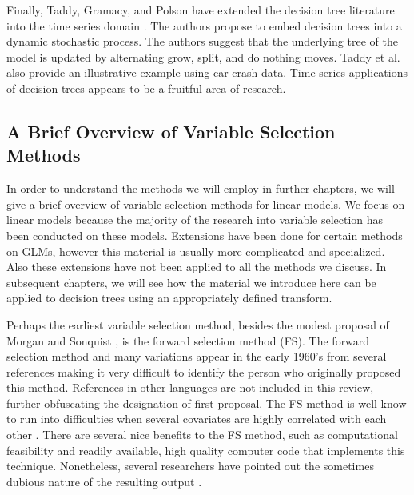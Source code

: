 Finally, Taddy, Gramacy, and Polson have extended the decision tree literature into the time series domain \cite{taddy2011dynamic}. The authors propose to embed decision trees into a dynamic stochastic process. The authors suggest that the underlying tree of the model is updated by alternating grow, split, and do nothing moves. Taddy et al. also provide an illustrative example using car crash data. Time series applications of decision trees appears to be a fruitful area of research. 

\subsection{A Brief Overview of Variable Selection Methods}

In order to understand the methods we will employ in further chapters, we will give a brief overview of variable selection methods for linear models. We focus on linear models because the majority of the research into variable selection has been conducted on these models. Extensions have been done for certain methods on GLMs, however this material is usually more complicated and specialized. Also these extensions have not been applied to all the methods we discuss. In subsequent chapters, we will see how the material we introduce here can be applied to decision trees using an appropriately defined transform. 

Perhaps the earliest variable selection method, besides the modest proposal of Morgan and Sonquist \cite{morgan1963problems}, is the forward selection method (FS). The forward selection method and many variations appear in the early 1960's from several references making it very difficult to identify the person who originally proposed this method. References in other languages are not included in this review, further obfuscating the designation of first proposal. The FS method is well know to run into difficulties when several covariates  are highly correlated with each other \cite{miller1984selection}. There are several nice benefits to the FS method, such as computational feasibility and readily available, high quality computer code that implements this technique. Nonetheless, several researchers have pointed out the sometimes dubious nature of the resulting output \cite{halvorson1960regression}. 

